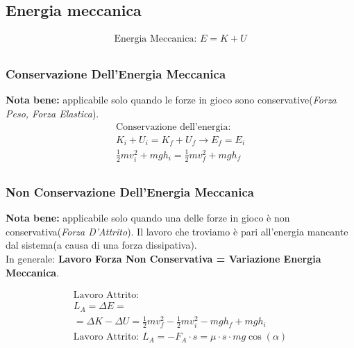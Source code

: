 \subsection{Energia meccanica}

\begin{gather*}
    \text{Energia Meccanica: } E = K + U \\
\end{gather*}
\subsubsection{Conservazione Dell'Energia Meccanica}
\textbf{Nota bene: } applicabile solo quando le forze in gioco sono conservative(\textit{Forza Peso, Forza Elastica}).
\begin{gather*}
    \text{Conservazione dell'energia: } \\ K_i + U_i = K_f + U_f \rightarrow E_f = E_i \\ \frac{1}{2} m v_i^2 + mgh_i = \frac{1}{2} mv_f^2 + mgh_f \\
\end{gather*}

\subsubsection{Non Conservazione Dell'Energia Meccanica}

\textbf{Nota bene: } applicabile solo quando una delle forze in gioco è non conservativa(\textit{Forza D'Attrito}). Il lavoro che troviamo è pari all'energia mancante dal sistema(a causa di una forza dissipativa). \\
In generale: \textbf{Lavoro Forza Non Conservativa = Variazione Energia Meccanica}.

\begin{gather*}
    \text{Lavoro Attrito: } \\ L_A = \Delta E = \\ = \Delta K - \Delta U = \frac{1}{2} m v_f^2 - \frac{1}{2} m v_i^2 - mgh_f + mgh_i \\
    \text{Lavoro Attrito: } L_A = - F_{A} \cdot s = \mu \cdot s \cdot m g \cos (\alpha)
\end{gather*}
